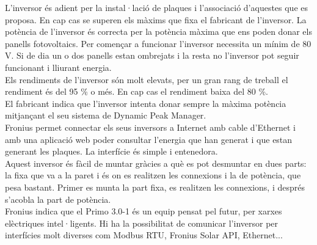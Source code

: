 \noindent L'inversor és adient per la instal·lació de plaques i l'associació d'aquestes que es proposa. En cap cas se superen els màxims que fixa el fabricant de l'inversor. La potència de l'inversor és correcta per la potència màxima que ens poden donar els panells fotovoltaics. Per començar a funcionar l'inversor necessita un mínim de 80 V. Si de dia un o dos panells estan ombrejats i la resta no l'inversor pot seguir funcionant i lliurant energia.\\
\newline Els rendiments de l'inversor són molt elevats, per un gran rang de treball el rendiment és del 95 \% o més. En cap cas el rendiment baixa del 80 \%.\\
\newline El fabricant indica que l'inversor intenta donar sempre la màxima potència mitjançant el seu sistema de Dynamic Peak Manager.\\
\newline Fronius permet connectar els seus inversors a Internet amb cable d'Ethernet i amb una aplicació web poder consultar l'energia que han generat i que estan generant les plaques. La interfície és simple i entenedora.\\
\newline Aquest inversor és fàcil de muntar gràcies a què es pot desmuntar en dues parts: la fixa que va a la paret i és on es realitzen les connexions i la de potència, que pesa bastant. Primer es munta la part fixa, es realitzen les connexions, i després s'acobla la part de potència.\\
\newline Fronius indica que el Primo 3.0-1 és un equip pensat pel futur, per xarxes elèctriques intel·ligents. Hi ha la possibilitat de comunicar l'inversor per interfícies molt diverses com Modbus RTU, Fronius Solar API, Ethernet...



\clearpage


